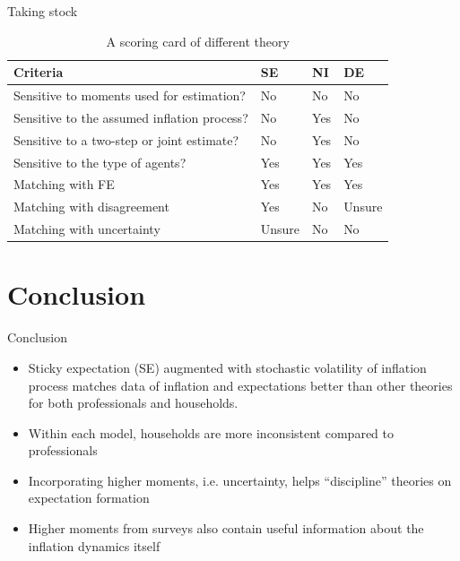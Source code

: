 \documentclass{beamer}
\begin{document}
\begin{frame}{Taking stock}
	\begin{table}[]
		\caption{A scoring card of different theory} 
		\begin{tabular}{llll}
				\hline 
			Criteria                                    & SE     & NI  & DE     \\
				\hline 
			Sensitive to moments used for estimation?   & No     & No  & No     \\
			Sensitive to the assumed inflation process? & No     & Yes & No     \\
			Sensitive to a two-step or joint estimate?  & No     & Yes & No     \\
			Sensitive to the type of agents?            & Yes    & Yes & Yes    \\
			Matching with FE                            & Yes    & Yes & Yes    \\
			Matching with disagreement                  & Yes    & No  & Unsure \\
			Matching with uncertainty                   & Unsure & No  & No    \\
			\hline 
		\end{tabular}
	\end{table}
	
\end{frame}



\section{Conclusion}

\begin{frame}{Conclusion}
	\begin{itemize}
		\item Sticky expectation (SE) augmented with stochastic volatility of inflation process matches data of inflation and expectations better than other theories for both professionals and households.
		\item Within each model,  households are more inconsistent  compared to professionals
		\item Incorporating higher moments, i.e. uncertainty,  helps ``discipline'' theories on expectation formation
		\item  Higher moments from surveys also contain useful information about the inflation dynamics itself
	\end{itemize}	
\end{frame}




\end{document}
